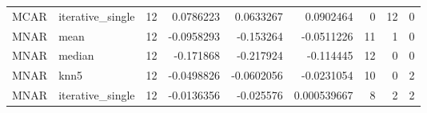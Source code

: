 \begin{table}[ht]
\begin{tabular}{llrrrrrrr}
 MCAR        & iterative\_single &           12 &                            0.0786223  &            0.0633267  &            0.0902464   &                         0 &                       12 &                                0 \\
 MNAR        & mean             &           12 &                           -0.0958293  &           -0.153264   &           -0.0511226   &                        11 &                        1 &                                0 \\
 MNAR        & median           &           12 &                           -0.171868   &           -0.217924   &           -0.114445    &                        12 &                        0 &                                0 \\
 MNAR        & knn5             &           12 &                           -0.0498826  &           -0.0602056  &           -0.0231054   &                        10 &                        0 &                                2 \\
 MNAR        & iterative\_single &           12 &                           -0.0136356  &           -0.025576   &            0.000539667 &                         8 &                        2 &                                2 \\
\hline
\end{tabular}
\end{table}
